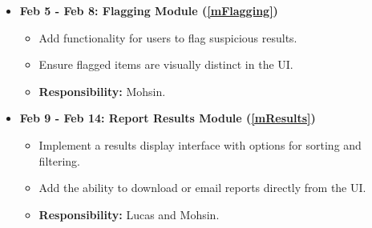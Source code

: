 \documentclass[12pt, titlepage]{article}
\begin{document}
\begin{itemize}
    \item \textbf{Feb 5 - Feb 8: Flagging Module (\ref{mFlagging})}
    \begin{itemize}
        \item Add functionality for users to flag suspicious results.
        \item Ensure flagged items are visually distinct in the UI.
        \item \textbf{Responsibility:} Mohsin.
    \end{itemize}
    
    \item \textbf{Feb 9 - Feb 14: Report Results Module (\ref{mResults})}
    \begin{itemize}
        \item Implement a results display interface with options for sorting and filtering.
        \item Add the ability to download or email reports directly from the UI.
        \item \textbf{Responsibility:} Lucas and Mohsin.
    \end{itemize}
\end{itemize}
\end{document}
